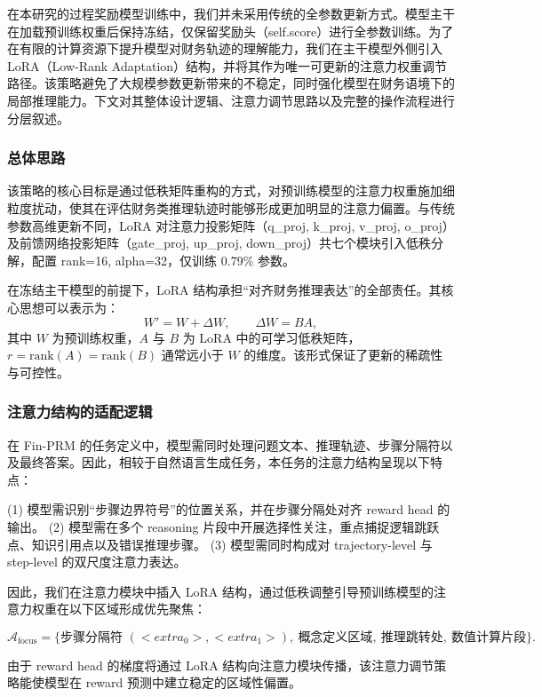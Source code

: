 \documentclass[professional,privacy,print,win,long,STEM,AutoFakeBold]{def/buaa}
\begin{document}
在本研究的过程奖励模型训练中，我们并未采用传统的全参数更新方式。模型主干在加载预训练权重后保持冻结，仅保留奖励头（self.score）进行全参数训练。为了在有限的计算资源下提升模型对财务轨迹的理解能力，我们在主干模型外侧引入 LoRA（Low-Rank Adaptation）结构，并将其作为唯一可更新的注意力权重调节路径。该策略避免了大规模参数更新带来的不稳定，同时强化模型在财务语境下的局部推理能力。下文对其整体设计逻辑、注意力调节思路以及完整的操作流程进行分层叙述。

\subsubsection{总体思路}

该策略的核心目标是通过低秩矩阵重构的方式，对预训练模型的注意力权重施加细粒度扰动，使其在评估财务类推理轨迹时能够形成更加明显的注意力偏置。与传统参数高维更新不同，LoRA 对注意力投影矩阵（q\_proj, k\_proj, v\_proj, o\_proj）及前馈网络投影矩阵（gate\_proj, up\_proj, down\_proj）共七个模块引入低秩分解，配置 rank=16, alpha=32，仅训练 0.79\% 参数。

在冻结主干模型的前提下，LoRA 结构承担“对齐财务推理表达”的全部责任。其核心思想可以表示为：
\[
W' = W + \Delta W,\qquad \Delta W = BA,
\]
其中 $W$ 为预训练权重，$A$ 与 $B$ 为 LoRA 中的可学习低秩矩阵，$r=\text{rank}(A)=\text{rank}(B)$ 通常远小于 $W$ 的维度。该形式保证了更新的稀疏性与可控性。

\subsubsection{注意力结构的适配逻辑}

在 Fin-PRM 的任务定义中，模型需同时处理问题文本、推理轨迹、步骤分隔符以及最终答案。因此，相较于自然语言生成任务，本任务的注意力结构呈现以下特点：

(1) 模型需识别“步骤边界符号”的位置关系，并在步骤分隔处对齐 reward head 的输出。  
(2) 模型需在多个 reasoning 片段中开展选择性关注，重点捕捉逻辑跳跃点、知识引用点以及错误推理步骤。  
(3) 模型需同时构成对 trajectory-level 与 step-level 的双尺度注意力表达。

因此，我们在注意力模块中插入 LoRA 结构，通过低秩调整引导预训练模型的注意力权重在以下区域形成优先聚焦：

\[
\mathcal{A}_{\text{focus}} = \{ \text{步骤分隔符 } (<extra_0>, <extra_1>),\ \text{概念定义区域},\ \text{推理跳转处},\ \text{数值计算片段} \}.
\]

由于 reward head 的梯度将通过 LoRA 结构向注意力模块传播，该注意力调节策略能使模型在 reward 预测中建立稳定的区域性偏置。
\end{document}
